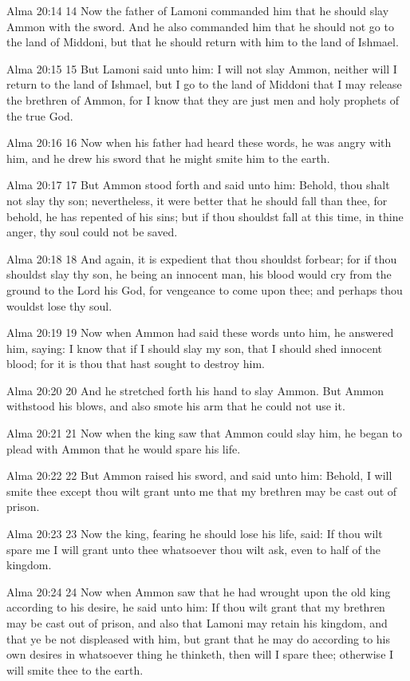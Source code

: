 Alma 20:14
 14 Now the father of Lamoni commanded him that he should slay
Ammon with the sword. And he also commanded him that he should
not go to the land of Middoni, but that he should return with him
to the land of Ishmael.

Alma 20:15
 15 But Lamoni said unto him: I will not slay Ammon, neither will
I return to the land of Ishmael, but I go to the land of Middoni
that I may release the brethren of Ammon, for I know that they
are just men and holy prophets of the true God.

Alma 20:16
 16 Now when his father had heard these words, he was angry with
him, and he drew his sword that he might smite him to the earth.

Alma 20:17
 17 But Ammon stood forth and said unto him: Behold, thou shalt
not slay thy son; nevertheless, it were better that he should
fall than thee, for behold, he has repented of his sins; but if
thou shouldst fall at this time, in thine anger, thy soul could
not be saved.

Alma 20:18
 18 And again, it is expedient that thou shouldst forbear; for if
thou shouldst slay thy son, he being an innocent man, his blood
would cry from the ground to the Lord his God, for vengeance to
come upon thee; and perhaps thou wouldst lose thy soul.

Alma 20:19
 19 Now when Ammon had said these words unto him, he answered
him, saying: I know that if I should slay my son, that I should
shed innocent blood; for it is thou that hast sought to destroy
him.

Alma 20:20
 20 And he stretched forth his hand to slay Ammon. But Ammon
withstood his blows, and also smote his arm that he could not use
it.

Alma 20:21
 21 Now when the king saw that Ammon could slay him, he began to
plead with Ammon that he would spare his life.

Alma 20:22
 22 But Ammon raised his sword, and said unto him: Behold, I will
smite thee except thou wilt grant unto me that my brethren may be
cast out of prison.

Alma 20:23
 23 Now the king, fearing he should lose his life, said: If thou
wilt spare me I will grant unto thee whatsoever thou wilt ask,
even to half of the kingdom.

Alma 20:24
 24 Now when Ammon saw that he had wrought upon the old king
according to his desire, he said unto him: If thou wilt grant
that my brethren may be cast out of prison, and also that Lamoni
may retain his kingdom, and that ye be not displeased with him,
but grant that he may do according to his own desires in
whatsoever thing he thinketh, then will I spare thee; otherwise I
will smite thee to the earth.

